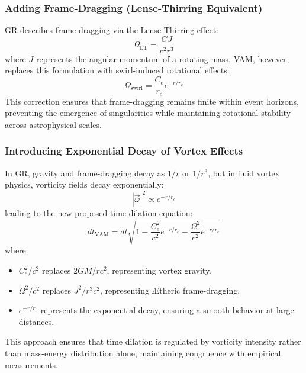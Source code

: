 \subsubsection*{Adding Frame-Dragging (Lense-Thirring Equivalent)}
GR describes frame-dragging via the Lense-Thirring effect:
\begin{equation}
    \Omega_{\text{LT}} = \frac{GJ}{c^2 r^3}
\end{equation}
where $J$ represents the angular momentum of a rotating mass. VAM, however, replaces this formulation with swirl-induced rotational effects:
\begin{equation}
    \Omega_{\text{swirl}} = \frac{C_e}{r_c} e^{-r/r_c}
\end{equation}
This correction ensures that frame-dragging remains finite within event horizons, preventing the emergence of singularities while maintaining rotational stability across astrophysical scales.

\subsubsection*{Introducing Exponential Decay of Vortex Effects}
In GR, gravity and frame-dragging decay as $1/r$ or $1/r^3$, but in fluid vortex physics, vorticity fields decay exponentially:
\begin{equation}
    |\vec{\omega}|^2 \propto e^{-r/r_c}
\end{equation}
leading to the new proposed time dilation equation:
\begin{equation}
    dt_{\text{VAM}} = dt \sqrt{1 - \frac{C_e^2}{c^2} e^{-r/r_c} - \frac{\Omega^2}{c^2} e^{-r/r_c}}
\end{equation}
where:
\begin{itemize}
    \item $C_e^2/c^2$ replaces $2GM/r c^2$, representing vortex gravity.
    \item $\Omega^2/c^2$ replaces $J^2/r^3 c^2$, representing \AE theric frame-dragging.
    \item $e^{-r/r_c}$ represents the exponential decay, ensuring a smooth behavior at large distances.
\end{itemize}
This approach ensures that time dilation is regulated by vorticity intensity rather than mass-energy distribution alone, maintaining congruence with empirical measurements.

